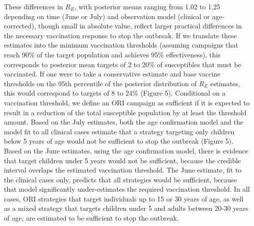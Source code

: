 These differences in $R_E$, with posterior means ranging from 1.02 to 1.25 depending on time (June or July) and observation model (clinical or age-corrected), though small in absolute value, reflect larger practical differences in the necessary vaccination response to stop the outbreak. If we translate these estimates into the minimum vaccination thresholds (assuming campaigns that reach 90\% of the target population and achieves 95\% effectiveness), this corresponds to posterior mean targets of 2 to 20\% of susceptibles that must be vaccinated. If one were to take a conservative estimate and base vaccine thresholds on the 95th percentile of the posterior distribution of $R_E$ estimates, this would correspond to targets of
8 to 24\% (Figure 5). Conditional on a vaccination threshold, we define an ORI campaign as sufficient if it is expected to result in a reduction of
the total susceptible population by at least the threshold amount. Based on the July estimates, both the age confirmation model and the model fit
to all clinical cases estimate that a strategy targeting only children below 5 years of age would not be sufficient to stop the outbreak
(Figure 5). Based on the June estimates, using the age confirmation model, there is evidence that target children under 5 years would not be
sufficient, because the credible interval overlaps the estimated vaccination threshold. The June estimate, fit to the clinical cases only, predicts
that all strategies would be sufficient, because that model significantly under-estimates the required vaccination threshold. In all cases, ORI strategies that target individuals up to 15 or 30 years of age, as well as a mixed strategy that targets children under 5 and adults between 20-30 years of age, are estimated to be sufficient to stop the outbreak.